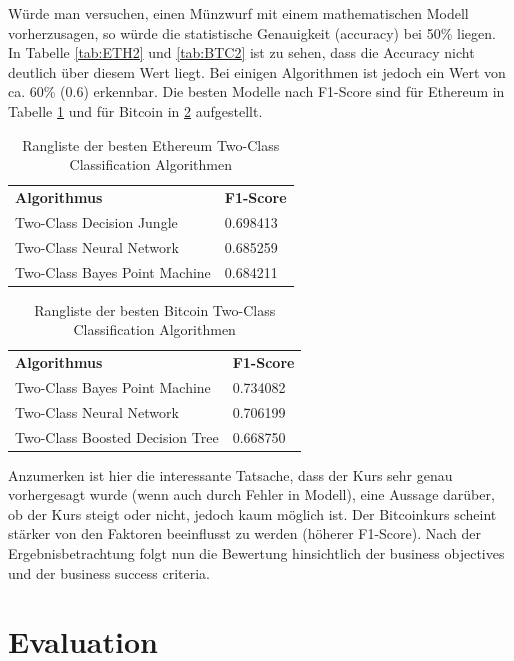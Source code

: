 Würde man versuchen, einen Münzwurf mit einem mathematischen Modell vorherzusagen, so würde die statistische Genauigkeit (accuracy) bei 50\% liegen. In Tabelle \ref{tab:ETH2} und \ref{tab:BTC2} ist zu sehen, dass die Accuracy nicht deutlich über diesem Wert liegt. Bei einigen Algorithmen ist jedoch ein Wert von ca. 60\% (0.6) erkennbar.
Die besten Modelle nach F1-Score sind für Ethereum in Tabelle \ref{tab:ETHBest} und für Bitcoin in \ref{tab:BTCBest} aufgestellt.
\begin{table}[H]
\centering
\begin{tabular}{|p{4cm}|p{4cm}|}
\hline
\textbf{Algorithmus} & \textbf{F1-Score}\\ 
\hhline{==}
Two-Class Decision Jungle & 0.698413 \\ \hline
Two-Class Neural Network & 0.685259 \\ \hline
Two-Class Bayes Point Machine & 0.684211 \\ \hline
\end{tabular}
\caption{Rangliste der besten Ethereum Two-Class Classification Algorithmen}
\label{tab:ETHBest}
\end{table}

\begin{table}[H]
\centering
\begin{tabular}{|p{4cm}|p{4cm}|}
\hline
\textbf{Algorithmus} & \textbf{F1-Score}\\ 
\hhline{==}
Two-Class Bayes Point Machine & 0.734082 \\ \hline
Two-Class Neural Network & 0.706199 \\ \hline
Two-Class Boosted Decision Tree & 0.668750 \\ \hline
\end{tabular}
\caption{Rangliste der besten Bitcoin Two-Class Classification Algorithmen}
\label{tab:BTCBest}
\end{table}
Anzumerken ist hier die interessante Tatsache, dass der Kurs sehr genau vorhergesagt wurde (wenn auch durch Fehler in Modell), eine Aussage darüber, ob der Kurs steigt oder nicht, jedoch kaum möglich ist. Der Bitcoinkurs scheint stärker von den Faktoren beeinflusst zu werden (höherer F1-Score).
Nach der Ergebnisbetrachtung folgt nun die Bewertung hinsichtlich der business objectives und der business success criteria.

\section{Evaluation}\label{sec:p5}
